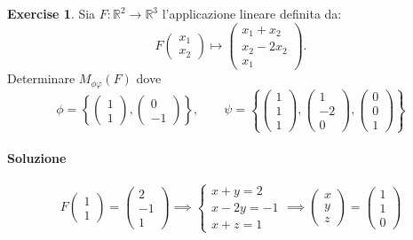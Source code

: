 \documentclass{article}
\theoremstyle{plain}
\theoremstyle{definition}
\newtheorem{xca}[exmp]{Exercise}
\theoremstyle{remark}
\begin{document}
\begin{bxthm}
\begin{xca}
    Sia $F:\mathbb{R}^2\to\mathbb{R}^3$ l'applicazione lineare definita da:
    \[F\begin{pmatrix}
        x_1\\
        x_2
    \end{pmatrix}\mapsto\begin{pmatrix}
        x_1+x_2\\
        x_2-2x_2\\
        x_1
    \end{pmatrix}.\]
    Determinare $M_{\phi\varphi}(F)$ dove 
    \[\phi=\left\{\begin{pmatrix}
        1\\
        1
    \end{pmatrix},\begin{pmatrix}
        0\\
        -1
    \end{pmatrix}\right\}, \quad\quad  \psi=\left\{\begin{pmatrix}
        1\\
        1\\
        1
    \end{pmatrix},\begin{pmatrix}
        1\\
        -2\\
        0
    \end{pmatrix},\begin{pmatrix}
        0\\
        0\\
        1
    \end{pmatrix}\right\}
    \]
\end{xca}
\end{bxthm}
\paragraph{Soluzione}
\[F\begin{pmatrix}1\\1\end{pmatrix}=\begin{pmatrix}2\\-1\\1\end{pmatrix}\implies
\begin{cases}
    x+y=2\\
    x-2y=-1\\
    x+z=1
\end{cases}\implies \begin{pmatrix}x\\y\\z\end{pmatrix} = \begin{pmatrix}1\\1\\0\end{pmatrix}\]
\end{document}
